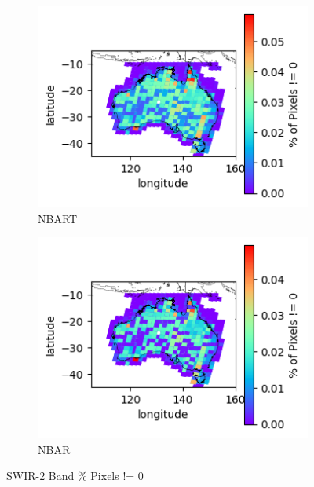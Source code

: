 \documentclass[a4paper]{article}
\begin{document}
      \begin{figure}[h!]
        \centering
          \begin{subfigure}[l]{.4\linewidth}
            \hspace{-32mm}
            \includegraphics[scale=0.9]{plots/nbart/nbart_swir_2-PercentDifferent.png}
            \caption{NBART}
          \end{subfigure}
%
          \begin{subfigure}[r]{.4\linewidth}
            \includegraphics[scale=0.9]{plots/nbar/nbar_swir_2-PercentDifferent.png}
            \caption{NBAR}
          \end{subfigure}
        \caption{SWIR-2 Band \% Pixels != 0}\label{figure:21}
      \end{figure}
\end{document}
